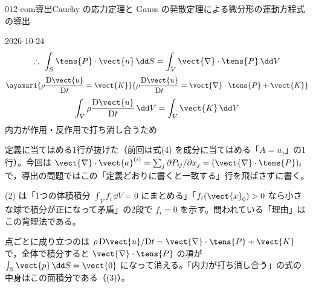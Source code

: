 \documentclass[uplatex,dvipdfmx,a4paper,11pt]{jsarticle}
\begin{document}
\begin{mondai}{012-eom}{導出}{Cauchy の応力定理と Gauss の発散定理による微分形の運動方程式の導出}
\begin{kotaeutsushi}{2026-10-24}
\[ \therefore\ \int_{S}\tens{P}\cdot\vect{n}\,\dd S=\int_{V}\vect{\nabla}\cdot\tens{P}\,\dd V \]
\[ \ayamari{\rho\frac{\mathrm{D}\vect{u}}{\mathrm{D}t}=\vect{K}}{\rho\frac{\mathrm{D}\vect{u}}{\mathrm{D}t}=\vect{\nabla}\cdot\tens{P}+\vect{K}} \]
\[ \int_{V}\rho\frac{\mathrm{D}\vect{u}}{\mathrm{D}t}\,\dd V=\int_{V}\vect{K}\,\dd V \]
内力が作用・反作用で打ち消し合うため
\end{kotaeutsushi}
\begin{kizuki}
\item {} 定義に当てはめる1行が抜けた（前回は式(4) を成分に当てはめる「$A=u_{j}$」の1行）。今回は $\vect{\nabla}\cdot\vect{a}^{(i)}=\sum_{j}\partial P_{ij}/\partial x_{j}=(\vect{\nabla}\cdot\tens{P})_{i}$ で，導出の問題ではこの「定義どおりに書くと一致する」行を飛ばさずに書く。
\item (2) は「1つの体積積分 $\int_{V}f_{i}\,\dd V=0$ にまとめる」「$f_{i}(\vect{x}_{0})>0$ なら小さな球で積分が正になって矛盾」の2段で $f_{i}=0$ を示す。問われている「理由」はこの背理法である。
\item 点ごとに成り立つのは $\rho\,\mathrm{D}\vect{u}/\mathrm{D}t=\vect{\nabla}\cdot\tens{P}+\vect{K}$ で，全体で積分すると $\vect{\nabla}\cdot\tens{P}$ の項が $\int_{S}\vect{p}\,\dd S=\vect{0}$ になって消える。「内力が打ち消し合う」の式の中身はこの面積分である（(3)）。
\end{kizuki}

\end{mondai}
\end{document}
